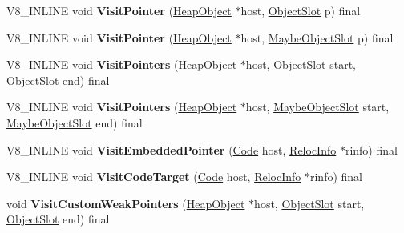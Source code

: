 \begin{DoxyCompactItemize}
\item 
\mbox{\label{classv8_1_1internal_1_1MarkingVisitor_a03e4ae5e1ef868936bac07e230ef7201}} 
V8\+\_\+\+I\+N\+L\+I\+NE void {\bfseries Visit\+Pointer} (\mbox{\hyperlink{classv8_1_1internal_1_1HeapObject}{Heap\+Object}} $\ast$host, \mbox{\hyperlink{classv8_1_1internal_1_1ObjectSlot}{Object\+Slot}} p) final
\item 
\mbox{\label{classv8_1_1internal_1_1MarkingVisitor_a3a3c3cf81da7404e8ebcf2f2651138e2}} 
V8\+\_\+\+I\+N\+L\+I\+NE void {\bfseries Visit\+Pointer} (\mbox{\hyperlink{classv8_1_1internal_1_1HeapObject}{Heap\+Object}} $\ast$host, \mbox{\hyperlink{classv8_1_1internal_1_1MaybeObjectSlot}{Maybe\+Object\+Slot}} p) final
\item 
\mbox{\label{classv8_1_1internal_1_1MarkingVisitor_a67bf50dcd7fffe5ce8c1135dbd596276}} 
V8\+\_\+\+I\+N\+L\+I\+NE void {\bfseries Visit\+Pointers} (\mbox{\hyperlink{classv8_1_1internal_1_1HeapObject}{Heap\+Object}} $\ast$host, \mbox{\hyperlink{classv8_1_1internal_1_1ObjectSlot}{Object\+Slot}} start, \mbox{\hyperlink{classv8_1_1internal_1_1ObjectSlot}{Object\+Slot}} end) final
\item 
\mbox{\label{classv8_1_1internal_1_1MarkingVisitor_abe2f4d9f65deb8a7d5ac9e0e5853665a}} 
V8\+\_\+\+I\+N\+L\+I\+NE void {\bfseries Visit\+Pointers} (\mbox{\hyperlink{classv8_1_1internal_1_1HeapObject}{Heap\+Object}} $\ast$host, \mbox{\hyperlink{classv8_1_1internal_1_1MaybeObjectSlot}{Maybe\+Object\+Slot}} start, \mbox{\hyperlink{classv8_1_1internal_1_1MaybeObjectSlot}{Maybe\+Object\+Slot}} end) final
\item 
\mbox{\label{classv8_1_1internal_1_1MarkingVisitor_a84cd2423c9fa8b0c6928e6b8019ecfcc}} 
V8\+\_\+\+I\+N\+L\+I\+NE void {\bfseries Visit\+Embedded\+Pointer} (\mbox{\hyperlink{classv8_1_1internal_1_1Code}{Code}} host, \mbox{\hyperlink{classv8_1_1internal_1_1RelocInfo}{Reloc\+Info}} $\ast$rinfo) final
\item 
\mbox{\label{classv8_1_1internal_1_1MarkingVisitor_ad20938e8520fd93c07883c3a9d90d23c}} 
V8\+\_\+\+I\+N\+L\+I\+NE void {\bfseries Visit\+Code\+Target} (\mbox{\hyperlink{classv8_1_1internal_1_1Code}{Code}} host, \mbox{\hyperlink{classv8_1_1internal_1_1RelocInfo}{Reloc\+Info}} $\ast$rinfo) final
\item 
\mbox{\label{classv8_1_1internal_1_1MarkingVisitor_af6a31eb071ab02ecb1208aafa4bb4b18}} 
void {\bfseries Visit\+Custom\+Weak\+Pointers} (\mbox{\hyperlink{classv8_1_1internal_1_1HeapObject}{Heap\+Object}} $\ast$host, \mbox{\hyperlink{classv8_1_1internal_1_1ObjectSlot}{Object\+Slot}} start, \mbox{\hyperlink{classv8_1_1internal_1_1ObjectSlot}{Object\+Slot}} end) final
\end{DoxyCompactItemize}
